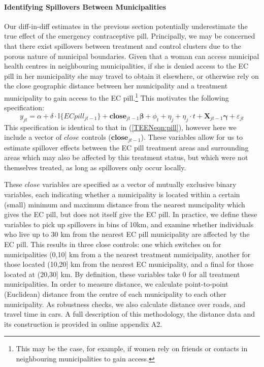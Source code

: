 \paragraph{Identifying Spillovers Between Municipalities}
\label{TEENsscn:spilloverID}
Our diff-in-diff estimates in the previous section potentially underestimate the 
true effect of the emergency contraceptive pill. Principally, we may be concerned 
that there exist spillovers between treatment and control clusters due to the 
porous nature of municipal boundaries. Given that a woman can access municipal 
health centres in neighbouring municipalities, if she is denied access to the EC
pill in her municipality she may travel to obtain it elsewhere, or otherwise rely 
on the close geographic distance between her municipality and a treatment 
municipality to gain access to the EC pill.\footnote{This may be the 
case, for example, if women rely on friends or contacts in neighbouring 
municipalities to gain access.}  This motivates the following specification:
\begin{equation}
 \label{TEENeqn:spillover}
y_{jt} = \alpha + \delta\cdot \mathbb{I}\{ECpill_{jt-1}\} + 
         \bm{close}_{jt-1}\bm{\beta} + \phi_t + \eta_j + \eta_j\cdot t + 
         \bm{X}_{jt-1}\bm{\gamma} + \varepsilon_{jt}
\end{equation}
This specification is identical to that in (\ref{TEENeqn:pill}), however here we 
include a vector of $close$ controls ($\bm{close}_{jt-1}$).  These variables allow
for us to estimate spillover effects between the EC pill treatment areas and
surrounding areas which may also be affected by this treatment status, but which 
were not themselves treated, as long as spillovers only occur locally.  

These $close$ variables are specified as a vector of mutually exclusive binary 
variables, each indicating whether a municipality is located within a certain
(small) minimum and maximum distance from the nearest muncipality which gives
the EC pill, but does not itself give the EC pill.  In practice, we define these
variables to pick up spillovers in bins of 10km, and examine whether individuals
who live up to 30 km from the nearest EC pill municipality are affected by the
EC pill.  This results in three close controls: one which switches on for
municipalities (0,10] km from a the nearest treatment municipality, another for
those located (10,20] km from the nearest EC municipality, and a final for those
located at (20,30] km.  By definition, these variables take 0
for all treatment municipalities.  In order to measure distance, we calculate 
point-to-point (Euclidean) distance from the centre of each municipality to each 
other municipality. As robustness checks, we also calculate distance over roads, 
and travel time in cars. A full description of this methodology, the distance 
data and its construction is provided in online appendix A2.

